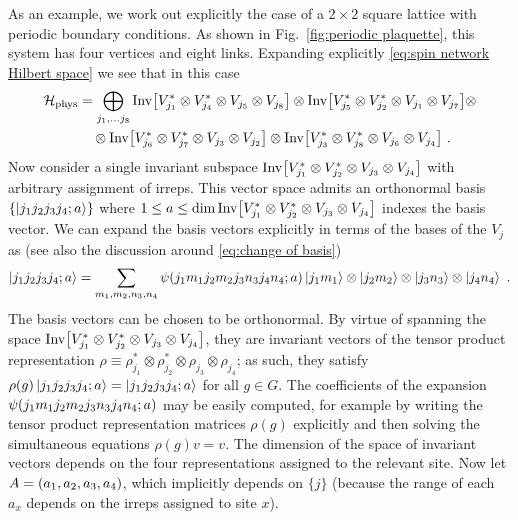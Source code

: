 As an example, we work out explicitly the case of a $2\times 2$ square lattice with periodic boundary conditions.
As shown in Fig.~\ref{fig:periodic plaquette}, this system has four vertices and eight links.
Expanding explicitly \eqref{eq:spin network Hilbert space} we see that in this case
\begin{align}
    \mathcal{H}_{\mathrm{phys}} &= \bigoplus_{j_1, \ldots j_8}
    \mathrm{Inv}\bqty{V_{j_1}^* \otimes V_{j_4}^* \otimes V_{j_5} \otimes V_{j_8}} \otimes
    \mathrm{Inv}\bqty{V_{j_5}^* \otimes V_{j_2}^* \otimes V_{j_1} \otimes V_{j_7}}  \otimes \\
    &\quad\otimes\mathrm{Inv}\bqty{V_{j_6}^* \otimes V_{j_7}^* \otimes V_{j_3} \otimes V_{j_2}} \otimes
    \mathrm{Inv}\bqty{V_{j_3}^* \otimes V_{j_8}^* \otimes V_{j_6} \otimes V_{j_4}} \ . \nonumber
\end{align}
Now consider a single invariant subspace $\mathrm{Inv}\bqty{V_{j_1}^* \otimes V_{j_2}^* \otimes V_{j_3} \otimes V_{j_4}}$ with arbitrary assignment of irreps.
This vector space admits an orthonormal basis $\{\ket{j_1 j_2 j_3 j_4 ; a}\}$ where $1 \leq a \leq \dim\mathrm{Inv}\bqty{V_{j_1}^* \otimes V_{j_2}^* \otimes V_{j_3} \otimes V_{j_4}}$ indexes the basis vector.
We can expand the basis vectors explicitly in terms of the bases of the $V_j$ as (see also the discussion around \eqref{eq:change of basis})
\begin{equation}
    \label{eq:invariant states at a site}
    \ket{j_1 j_2 j_3 j_4 ; a} = \sum_{m_1, m_2, n_3, n_4} \psi\pqty{j_1 m_1 j_2 m_2 j_3 n_3 j_4 n_4 ; a} \ket{j_1 m_1} \otimes \ket{j_2 m_2} \otimes \ket{j_3 n_3} \otimes \ket{j_4 n_4} \ .
\end{equation}
The basis vectors can be chosen to be orthonormal.
By virtue of spanning the space $\mathrm{Inv}\bqty{V_{j_1}^* \otimes V_{j_2}^* \otimes V_{j_3} \otimes V_{j_4}}$, they are invariant vectors of the tensor product representation $\rho \equiv \rho_{j_1}^* \otimes \rho_{j_2}^* \otimes \rho_{j_3} \otimes \rho_{j_4}$; as such, they satisfy $\rho(g) \ket{j_1 j_2 j_3 j_4 ; a} = \ket{j_1 j_2 j_3 j_4 ; a}$ for all $g \in G$.
The coefficients of the expansion $\psi\pqty{j_1 m_1 j_2 m_2 j_3 n_3 j_4 n_4 ; a}$ may be easily computed, for example by writing the tensor product representation matrices $\rho(g)$ explicitly and then solving the simultaneous equations $\rho(g) v = v$.
The dimension of the space of invariant vectors depends on the four representations assigned to the relevant site.
Now let $A = \pqty{a_1, a_2, a_3, a_4}$, which implicitly depends on $\{j\}$ (because the range of each $a_x$ depends on the irreps assigned to site $x$).

